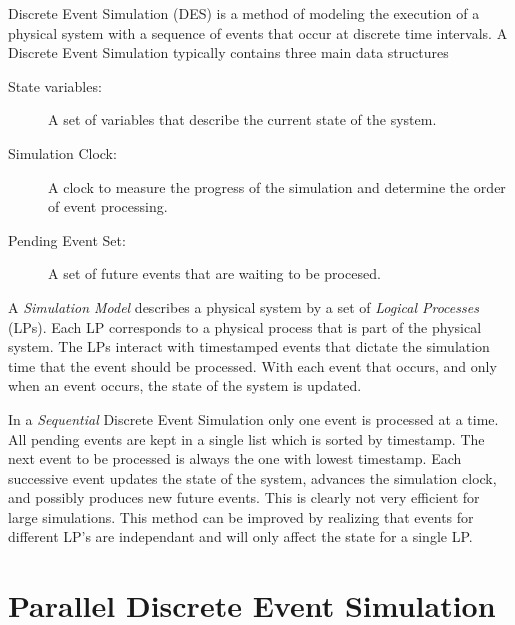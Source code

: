 \documentclass[11pt]{book}
\begin{document}
Discrete Event Simulation (DES) is a method of modeling the execution of a physical system
with a sequence of events that occur at discrete time intervals. A Discrete Event Simulation
typically contains three main data structures

\begin{description}
    \item[State variables: ] A set of variables that describe the current state of the system.
    \item[Simulation Clock: ] A clock to measure the progress of the simulation and determine
        the order of event processing.
    \item[Pending Event Set: ] A set of future events that are waiting to be procesed.
\end{description}

\noindent
A \emph{Simulation Model} describes a physical system by a set of \emph{Logical Processes}
(LPs). Each LP corresponds to a physical process that is part of the physical system. The
LPs interact with timestamped events that dictate the simulation time that the event should
be processed. With each event that occurs, and only when an event occurs, the state of the
system is updated.

In a \emph{Sequential} Discrete Event Simulation only one event is processed at a time.
All pending events are kept in a single list which is sorted by timestamp. The next event
to be processed is always the one with lowest timestamp. Each successive event updates the
state of the system, advances the simulation clock, and possibly produces new future events.
This is clearly not very efficient for large simulations. This method can be improved by
realizing that events for different LP's are independant and will only affect the state for
a single LP.

\section{Parallel Discrete Event Simulation}
\end{document}
